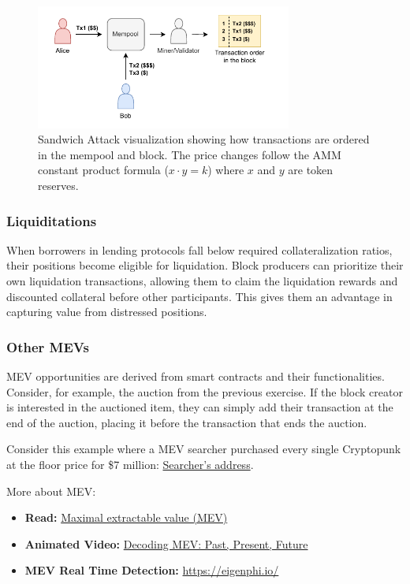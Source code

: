 \documentclass[12pt]{article}
\begin{document}
\begin{figure}[H]
  \centering
  \includegraphics[width=0.75\textwidth]{sandwich.pdf}
  \caption{Sandwich Attack visualization showing how transactions are ordered in the mempool and block. The price changes follow the AMM constant product formula ($x \cdot y = k$) where $x$ and $y$ are token reserves.}
  \label{fig:sandwich}
\end{figure}

\subsubsection*{Liquiditations} When borrowers in lending protocols fall below required collateralization ratios, their positions become eligible for liquidation. Block producers can prioritize their own liquidation transactions, allowing them to claim the liquidation rewards and discounted collateral before other participants. This gives them an advantage in capturing value from distressed positions.

\subsubsection*{Other MEVs}
MEV opportunities are derived from smart contracts and their functionalities. Consider, for example, the auction from the previous exercise. If the block creator is interested in the auctioned item, they can simply add their transaction at the end of the auction, placing it before the transaction that ends the auction.

Consider this example where a MEV searcher purchased every single Cryptopunk at the floor price for \$7 million: \href{https://etherscan.io/address/0x650dCdEB6ecF05aE3CAF30A70966E2F395d5E9E5}{Searcher's address}.

\medskip
\noindent
More about MEV:
\begin{itemize}
  \item \textbf{Read:} \href{https://ethereum.org/en/developers/docs/mev/}{Maximal extractable value (MEV)}
  \item \textbf{Animated Video:} \href{https://www.youtube.com/watch?v=F9IuBZGseFQ}{Decoding MEV: Past, Present, Future}
  \item \textbf{MEV Real Time Detection:} \href{https://eigenphi.io/}{https://eigenphi.io/}
\end{itemize}
\end{document}
